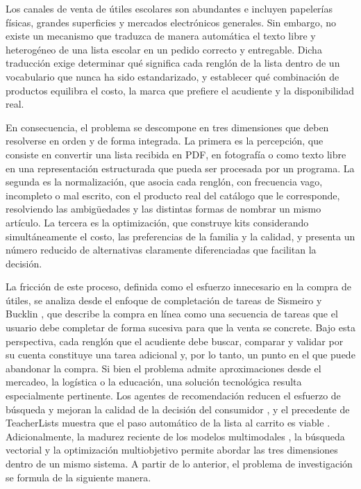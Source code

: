 Los canales de venta de útiles escolares son abundantes e incluyen papelerías físicas,
grandes superficies y mercados electrónicos generales. Sin embargo, no existe un mecanismo
que traduzca de manera automática el texto libre y heterogéneo de una lista escolar en un
pedido correcto y entregable. Dicha traducción exige determinar qué significa cada renglón
de la lista dentro de un vocabulario que nunca ha sido estandarizado, y establecer qué
combinación de productos equilibra el costo, la marca que prefiere el acudiente y la
disponibilidad real.\par

En consecuencia, el problema se descompone en tres dimensiones que deben resolverse en orden
y de forma integrada. La primera es la percepción, que consiste en convertir una lista
recibida en PDF, en fotografía o como texto libre en una representación estructurada que
pueda ser procesada por un programa. La segunda es la normalización, que asocia cada
renglón, con frecuencia vago, incompleto o mal escrito, con el producto real del catálogo
que le corresponde, resolviendo las ambigüedades y las distintas formas de nombrar un mismo
artículo. La tercera es la optimización, que construye kits considerando simultáneamente el
costo, las preferencias de la familia y la calidad, y presenta un número reducido de
alternativas claramente diferenciadas que facilitan la decisión.\par

La fricción de este proceso, definida como el esfuerzo innecesario en la compra de útiles, se analiza desde el enfoque de completación de tareas de
Sismeiro y Bucklin \citep{sismeiro_modeling_2004}, que describe la compra en línea como una
secuencia de tareas que el usuario debe completar de forma sucesiva para que la venta se
concrete. Bajo esta perspectiva, cada renglón que el acudiente debe buscar, comparar y
validar por su cuenta constituye una tarea adicional y, por lo tanto, un punto en el que
puede abandonar la compra. 
Si bien el problema admite aproximaciones desde el mercadeo, la
logística o la educación, una solución tecnológica resulta especialmente pertinente. Los
agentes de recomendación reducen el esfuerzo de búsqueda y mejoran la calidad de la
decisión del consumidor \citep{haubl_consumer_2000}, y el precedente de TeacherLists
muestra que el paso automático de la lista al carrito es viable
\citep{teacherlists_retail_2026}. Adicionalmente, la madurez reciente de los modelos
multimodales \citep{shen_ocr_2026}, la búsqueda vectorial \citep{karpukhin_dense_2020} y la
optimización multiobjetivo \citep{deb_fast_2002} permite abordar las tres dimensiones dentro
de un mismo sistema. A partir de lo anterior, el problema de investigación se formula de la
siguiente manera.\par

